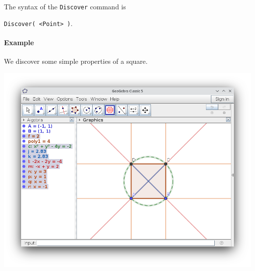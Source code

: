 \documentclass{article}
\begin{document}
The syntax of the \texttt{Discover} command is
\begin{center}
    \texttt{Discover( <Point> )}.
\end{center}

\paragraph{Example} We discover some simple properties of a square.

\begin{center}
\includegraphics[scale=0.5]{Discover-example-1}
\end{center}
\end{document}
